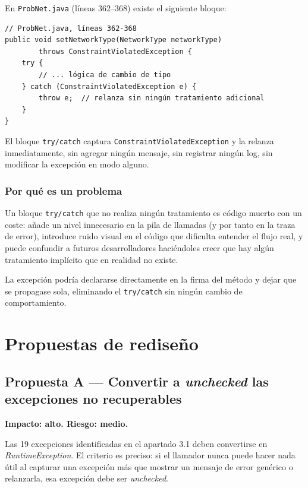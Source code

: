 \documentclass[11pt,a4paper]{article}
\begin{document}
En \texttt{ProbNet.java} (líneas 362--368) existe el siguiente bloque:

\begin{lstlisting}[caption={Re-lanzamiento vacío en \texttt{ProbNet.setNetworkType()}},label={lst:relaunch-empty}]
// ProbNet.java, líneas 362-368
public void setNetworkType(NetworkType networkType)
        throws ConstraintViolatedException {
    try {
        // ... lógica de cambio de tipo
    } catch (ConstraintViolatedException e) {
        throw e;  // relanza sin ningún tratamiento adicional
    }
}
\end{lstlisting}

El bloque \texttt{try/catch} captura \texttt{ConstraintViolatedException} y la relanza
inmediatamente, sin agregar ningún mensaje, sin registrar ningún log, sin modificar la excepción
en modo alguno.

\subsubsection{Por qué es un problema}

Un bloque \texttt{try/catch} que no realiza ningún tratamiento es código muerto con un coste:
añade un nivel innecesario en la pila de llamadas (y por tanto en la traza de error), introduce
ruido visual en el código que dificulta entender el flujo real, y puede confundir a futuros
desarrolladores haciéndoles creer que hay algún tratamiento implícito que en realidad no existe.

La excepción podría declararse directamente en la firma del método y dejar que se propagase
sola, eliminando el \texttt{try/catch} sin ningún cambio de comportamiento.

\newpage

\section{Propuestas de rediseño}

\subsection{Propuesta A — Convertir a \textit{unchecked} las excepciones no recuperables}

\textbf{Impacto: alto. Riesgo: medio.}

Las 19 excepciones identificadas en el apartado 3.1 deben convertirse en \textit{RuntimeException}.
El criterio es preciso: si el llamador nunca puede hacer nada útil al capturar una excepción más
que mostrar un mensaje de error genérico o relanzarla, esa excepción debe ser \textit{unchecked}.
\end{document}
